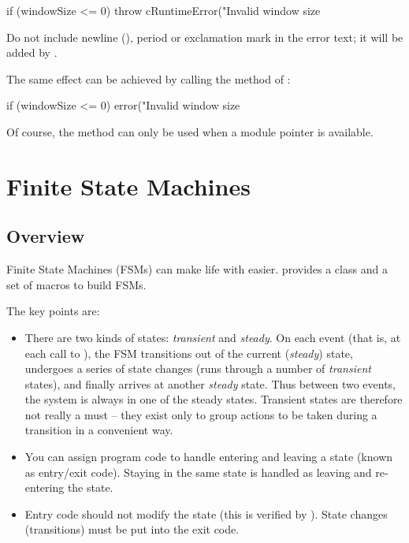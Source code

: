 \begin{cpp}
if (windowSize <= 0)
    throw cRuntimeError("Invalid window size %
\end{cpp}

Do not include newline (), period or exclamation mark
in the error text; it will be added by {\opp}.

The same effect can be achieved by calling the  method of
:

\begin{cpp}
if (windowSize <= 0)
    error("Invalid window size %
\end{cpp}

Of course, the  method can only be used when a module pointer
is available.



\section{Finite State Machines}
\label{sec:simple-modules:fsm}

\subsection{Overview}
\label{sec:simple-modules:fsm-overview}

Finite State Machines (FSMs)
can make life with  easier. {\opp} provides a
class and a set of macros to build FSMs.

The key points are:
\begin{itemize}
\item There are two kinds of states:
    \textit{transient} and
    \textit{steady}. On each event (that is, at
    each call to ), the FSM transitions out of
    the current (\textit{steady}) state, undergoes a series of state
    changes (runs through a number of \textit{transient} states), and
    finally arrives at another \textit{steady} state. Thus between two
    events, the system is always in one of the steady states.
    Transient states are therefore not really a must -- they exist
    only to group actions to be taken during a transition in a
    convenient way.
\item You can assign program code to handle entering and leaving a state
    (known as entry/exit code).
    Staying in the same state is handled as leaving and re-entering
    the state.
\item Entry code should not modify the state (this is verified by
    {\opp}).  State changes (transitions) must be put into the exit
    code.
\end{itemize}

